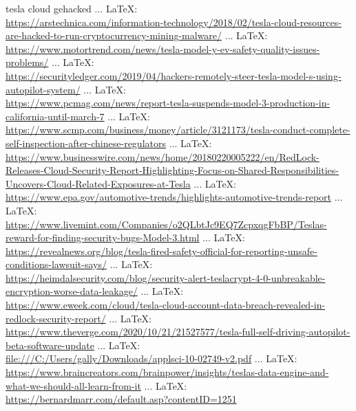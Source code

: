 \begin{thebibliography}{99}
tesla cloud gehacked
 ... \LaTeX:\\ \url{https://arstechnica.com/information-technology/2018/02/tesla-cloud-resources-are-hacked-to-run-cryptocurrency-mining-malware/}
 ... \LaTeX:\\ \url{https://www.motortrend.com/news/tesla-model-y-ev-safety-quality-issues-problems/}
 ... \LaTeX:\\ \url{https://securityledger.com/2019/04/hackers-remotely-steer-tesla-model-s-using-autopilot-system/}
 ... \LaTeX:\\ \url{https://www.pcmag.com/news/report-tesla-suspends-model-3-production-in-california-until-march-7}
 ... \LaTeX:\\ \url{https://www.scmp.com/business/money/article/3121173/tesla-conduct-complete-self-inspection-after-chinese-regulators}
 ... \LaTeX:\\ \url{https://www.businesswire.com/news/home/20180220005222/en/RedLock-Releases-Cloud-Security-Report-Highlighting-Focus-on-Shared-Responsibilities-Uncovers-Cloud-Related-Exposures-at-Tesla}
 ... \LaTeX:\\ \url{https://www.epa.gov/automotive-trends/highlights-automotive-trends-report}
 ... \LaTeX:\\ \url{https://www.livemint.com/Companies/o2QLbtJc9EQ7ZcpxqgFbBP/Teslas-reward-for-finding-security-bugs-Model-3.html}
 ... \LaTeX:\\ \url{https://revealnews.org/blog/tesla-fired-safety-official-for-reporting-unsafe-conditions-lawsuit-says/}
 ... \LaTeX:\\ \url{https://heimdalsecurity.com/blog/security-alert-teslacrypt-4-0-unbreakable-encryption-worse-data-leakage/}
 ... \LaTeX:\\ \url{https://www.eweek.com/cloud/tesla-cloud-account-data-breach-revealed-in-redlock-security-report/}
 ... \LaTeX:\\ \url{https://www.theverge.com/2020/10/21/21527577/tesla-full-self-driving-autopilot-beta-software-update}
 ... \LaTeX:\\ \url{file:///C:/Users/gally/Downloads/applsci-10-02749-v2.pdf}
 ... \LaTeX:\\ \url{https://www.braincreators.com/brainpower/insights/teslas-data-engine-and-what-we-should-all-learn-from-it}
 ... \LaTeX:\\ \url{https://bernardmarr.com/default.asp?contentID=1251}

\end{thebibliography}
